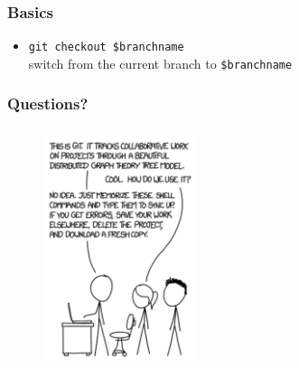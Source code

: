 \documentclass{beamer}
\begin{document}
\begin{frame}[fragile]
\frametitle{Basics}
\begin{itemize}
\item \verb!git checkout $branchname! \\ 
switch from the current branch to \verb!$branchname!
\end{itemize}
\end{frame}

\begin{frame}[fragile]
\frametitle{Questions?}
\begin{figure}
\centering
\includegraphics[height=7cm, width=4.5cm]{questions}
\end{figure}
\end{frame}
\end{document}
